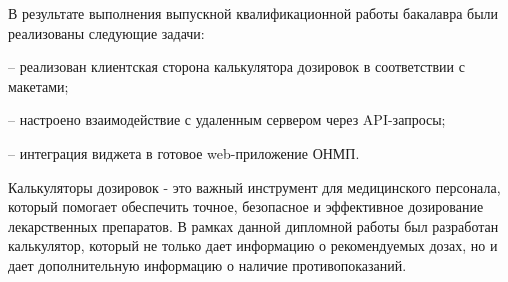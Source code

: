 \conclusion
В результате выполнения выпускной квалификационной работы бакалавра были реализованы следующие задачи:

-- реализован клиентская сторона калькулятора дозировок в соответствии с макетами;

-- настроено взаимодействие с удаленным сервером через API-запросы;

-- интеграция виджета в готовое web-приложение ОНМП.

Калькуляторы дозировок - это важный инструмент для медицинского персонала, который помогает обеспечить точное, безопасное и эффективное дозирование лекарственных препаратов. В рамках данной дипломной работы был разработан калькулятор, который не только дает информацию о рекомендуемых дозах, но и дает дополнительную информацию о наличие противопоказаний. 




